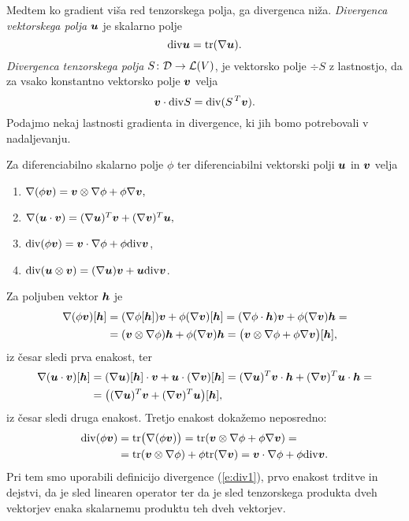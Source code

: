 Medtem ko gradient viša red tenzorskega polja, ga divergenca niža.
\emph{Divergenca vektorskega polja} $\boldsymbol u$ je skalarno polje
\begin{equation} \label{e:div1}
	\mathrm{div}\boldsymbol u=\mathrm{tr}(\nabla\boldsymbol u).
\end{equation}
\emph{Divergenca tenzorskega polja} $S\colon\mathcal{D}\to\mathcal L(V)$, je vektorsko polje $\div S$ z lastnostjo,
da za vsako konstantno vektorsko polje $\boldsymbol v$ velja
\begin{equation} \label{e:div2}
	\boldsymbol v\cdot\mathrm{div} S = \mathrm{div}(S^{\,T}\boldsymbol v).
\end{equation}
Podajmo nekaj lastnosti gradienta in divergence, ki jih bomo potrebovali v nadaljevanju.
\begin{trditev} \label{t:divprop}
	Za diferenciabilno skalarno polje $\phi$ ter diferenciabilni vektorski polji $\boldsymbol u$ in $\boldsymbol v$ velja
	\begin{enumerate}
		\item $\nabla(\phi\boldsymbol v)=\boldsymbol v\otimes\nabla\phi+\phi\nabla\boldsymbol v,$
		\item $\nabla(\boldsymbol u\cdot\boldsymbol v)=(\nabla\boldsymbol u)^T\boldsymbol v+(\nabla\boldsymbol v)^T\boldsymbol u,$
		\item $\mathrm{div}(\phi\boldsymbol v)=\boldsymbol v\cdot\nabla\phi+\phi\mathrm{div}\boldsymbol v$,
		\item $\mathrm{div}(\boldsymbol u\otimes\boldsymbol v)=(\nabla\boldsymbol u)\boldsymbol v+\boldsymbol u\mathrm{div}\boldsymbol v$.
	\end{enumerate}
\end{trditev}
\proof
	Za poljuben vektor $\boldsymbol h$ je
	\begin{align*}
		\nabla(\phi\boldsymbol v)[\boldsymbol h]&=(\nabla\phi[\boldsymbol h])\boldsymbol v+\phi(\nabla\boldsymbol v)[\boldsymbol h]=
		(\nabla\phi\cdot\boldsymbol h)\boldsymbol v+\phi(\nabla\boldsymbol v)\boldsymbol h=\\
		&=(\boldsymbol v\otimes\nabla\phi)\boldsymbol h+\phi(\nabla\boldsymbol v)\boldsymbol h=
		\big(\boldsymbol v\otimes\nabla\phi+\phi\nabla\boldsymbol v\big)[\boldsymbol h],
	\end{align*}
	iz česar sledi prva enakost, ter
	\begin{align*}
		\nabla(\boldsymbol u\cdot\boldsymbol v)[\boldsymbol h]&=(\nabla\boldsymbol u)[\boldsymbol h]\cdot\boldsymbol v+\boldsymbol u\cdot(\nabla\boldsymbol v)[\boldsymbol h]=
		(\nabla\boldsymbol u)^T\boldsymbol v\cdot\boldsymbol h+(\nabla\boldsymbol v)^T\boldsymbol u\cdot\boldsymbol h=\\
		&=\big((\nabla\boldsymbol u)^T\boldsymbol v+(\nabla\boldsymbol v)^T\boldsymbol u\big)[\boldsymbol h],
	\end{align*}
	iz česar sledi druga enakost. Tretjo enakost dokažemo neposredno:
	\begin{align*}
		\mathrm{div}(\phi\boldsymbol v)&=\mathrm{tr}\big(\nabla(\phi\boldsymbol v)\big)=\mathrm{tr}(\boldsymbol v\otimes\nabla\phi+\phi\nabla\boldsymbol v)=\\
		&=\mathrm{tr}(\boldsymbol v\otimes\nabla\phi)+\phi\mathrm{tr}(\nabla\boldsymbol v)=\boldsymbol v\cdot\nabla\phi+\phi\mathrm{div}\boldsymbol v.
	\end{align*}
	Pri tem smo uporabili definicijo divergence (\ref{e:div1}), prvo enakost trditve in dejstvi, da je sled
	linearen operator ter da je sled tenzorskega produkta dveh vektorjev enaka skalarnemu produktu teh
	dveh vektorjev.
	
